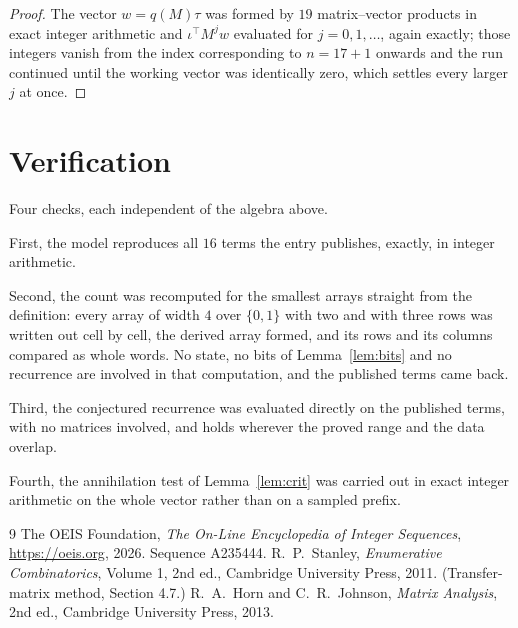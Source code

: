 \documentclass[11pt,a4paper]{article}
\theoremstyle{plain}
\theoremstyle{definition}
\begin{document}
\begin{proof}
The vector $w=q(M)\tau$ was formed by $19$ matrix--vector products in exact integer
arithmetic and $\iota^{\!\top}M^{j}w$ evaluated for $j=0,1,\dots$, again exactly; those
integers vanish from the index corresponding to $n=17+1$ onwards and the run continued
until the working vector was identically zero, which settles every larger $j$ at once.
\end{proof}

\section{Verification}

Four checks, each independent of the algebra above.

First, the model reproduces all $16$ terms the entry publishes, exactly, in integer
arithmetic.

Second, the count was recomputed for the smallest arrays straight from the definition: every
array of width $4$ over $\{0,1\}$ with two and with three rows was written out cell by cell,
the derived array formed, and its rows and its columns compared as whole words. No state, no
bits of Lemma~\ref{lem:bits} and no recurrence are involved in that computation, and the
published terms came back.

Third, the conjectured recurrence was evaluated directly on the published terms, with no
matrices involved, and holds wherever the proved range and the data overlap.

Fourth, the annihilation test of Lemma~\ref{lem:crit} was carried out in exact integer
arithmetic on the whole vector rather than on a sampled prefix.

\begin{thebibliography}{9}
 The OEIS Foundation, \emph{The On-Line Encyclopedia of Integer
Sequences}, \url{https://oeis.org}, 2026. Sequence A235444.
 R.~P.~Stanley, \emph{Enumerative Combinatorics}, Volume 1, 2nd ed.,
Cambridge University Press, 2011. (Transfer-matrix method, Section 4.7.)
 R.~A.~Horn and C.~R.~Johnson, \emph{Matrix Analysis}, 2nd ed., Cambridge
University Press, 2013.
\end{thebibliography}
\end{document}
